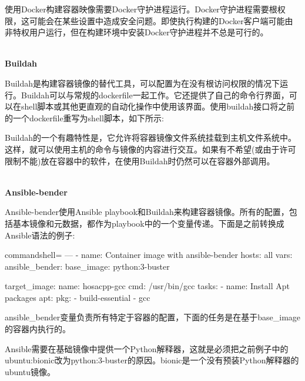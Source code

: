 
使用Docker构建容器映像需要Docker守护进程运行。Docker守护进程需要根权限，这可能会在某些设置中造成安全问题。即使执行构建的Docker客户端可能由非特权用户运行，但在构建环境中安装Docker守护进程并不总是可行的。

\hspace*{\fill} \\ %
\noindent
\textbf{Buildah}

Buildah是构建容器镜像的替代工具，可以配置为在没有根访问权限的情况下运行。Buildah可以与常规的dockerfile一起工作。它还提供了自己的命令行界面，可以在shell脚本或其他更直观的自动化操作中使用该界面。使用buildah接口将之前的一个dockerfile重写为shell脚本，如下所示:


Buildah的一个有趣特性是，它允许将容器镜像文件系统挂载到主机文件系统中。这样，就可以使用主机的命令与镜像的内容进行交互。如果有不希望(或由于许可限制不能)放在容器中的软件，在使用Buildah时仍然可以在容器外部调用。

\hspace*{\fill} \\ %
\noindent
\textbf{Ansible-bender}

Ansible-bender使用Ansible playbook和Buildah来构建容器镜像。所有的配置，包括基本镜像和元数据，都作为playbook中的一个变量传递。下面是之前转换成Ansible语法的例子:

\begin{tcblisting}{commandshell={}}
---
- name: Container image with ansible-bender
  hosts: all
  vars:
    ansible_bender:
      base_image: python:3-buster
    
      target_image:
        name: hosacpp-gcc
        cmd: /usr/bin/gcc
tasks:
- name: Install Apt packages
  apt:
    pkg:
      - build-essential
      - gcc
\end{tcblisting}

ansible\_bender变量负责所有特定于容器的配置，下面的任务是在基于base\_image的容器内执行的。

Ansible需要在基础镜像中提供一个Python解释器，这就是必须把之前例子中的ubuntu:bionic改为python:3-buster的原因。bionic是一个没有预装Python解释器的ubuntu镜像。

